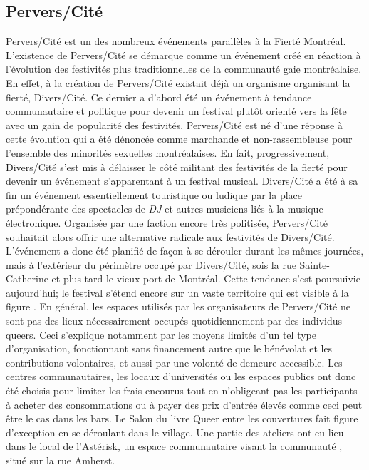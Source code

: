 \subsection{Pervers/Cité}
\label{subsec:perverscite}
Pervers/Cité est un des nombreux événements parallèles à la Fierté Montréal.
L'existence de Pervers/Cité se démarque comme un événement créé en réaction à l'évolution des festivités plus traditionnelles de la communauté gaie montréalaise.
En effet, à la création de Pervers/Cité existait déjà un organisme organisant la fierté, Divers/Cité.
Ce dernier a d'abord été un événement à tendance communautaire et politique pour devenir un festival plutôt orienté vers la fête avec un gain de popularité des festivités.
Pervers/Cité est né d'une réponse à cette évolution qui a été dénoncée comme marchande et non-rassembleuse pour l'ensemble des minorités sexuelles montréalaises.
En fait, progressivement, Divers/Cité s'est mis à délaisser le côté militant des festivités de la fierté pour  devenir un événement s'apparentant à un festival musical.
Divers/Cité a été à sa fin un événement essentiellement touristique ou ludique par la place prépondérante des spectacles de \emph{DJ} et autres musiciens liés à la musique électronique.
Organisée par une faction encore très politisée, Pervers/Cité souhaitait alors offrir une alternative radicale aux festivités de Divers/Cité.
L'événement a donc été planifié de façon à se dérouler durant les mêmes journées, mais à l'extérieur du périmètre occupé par Divers/Cité, sois la rue Sainte-Catherine et plus tard le vieux port de Montréal.
Cette tendance s'est poursuivie aujourd'hui; le festival s'étend encore sur un vaste territoire qui est visible à la figure .
En général, les espaces utilisés par les organisateurs de Pervers/Cité ne sont pas des lieux nécessairement occupés quotidiennement par des individus queers.
Ceci s'explique notamment par les moyens limités d'un tel type d'organisation, fonctionnant sans financement autre que le bénévolat et les contributions volontaires, et aussi par une volonté de demeure accessible.
Les centres communautaires, les locaux d'universités ou les espaces publics ont donc été choisis pour limiter les frais encourus tout en n’obligeant pas les participants à acheter des consommations ou à payer des prix d'entrée élevés comme ceci peut être le cas dans les bars.
Le Salon du livre Queer entre les couvertures fait figure d'exception en se déroulant dans le village.
Une partie des ateliers ont eu lieu dans le local de l'Astérisk, un espace communautaire visant la communauté \lgbt{}, situé sur la rue Amherst.

